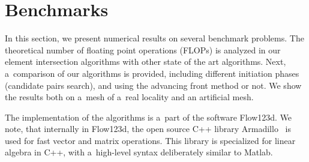 % 





\section{Benchmarks}
\label{sec:benchmarks}

In this section, we present numerical results on several benchmark problems. 
The theoretical number of floating point operations (FLOPs) is analyzed in our element intersection algorithms with 
other state of the art algorithms.
Next, a~comparison of our algorithms is provided, including different initiation phases (candidate pairs search),
and using the advancing front method or not. We show the results both on a~mesh of a~real locality
and an artificial mesh.

The implementation of the algorithms is a~part of the software Flow123d.
We note, that internally in Flow123d, the open source C++ library Armadillo~\cite{armadillo_2016} is used
for fast vector and matrix operations.
This library is specialized for linear algebra in C++, with a~high-level syntax deliberately similar to Matlab.


